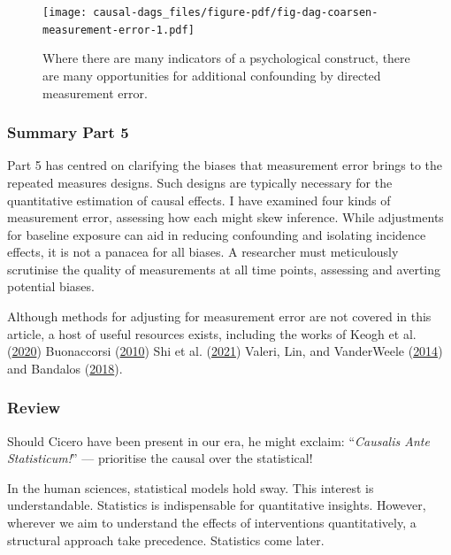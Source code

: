 \documentclass[
  singlecolumn]{article}
\begin{document}
\begin{figure}

{\centering \texttt{[image: causal-dags\_files/figure-pdf/fig-dag-coarsen-measurement-error-1.pdf]}

}

\caption{\label{fig-dag-coarsen-measurement-error}Where there are many
indicators of a psychological construct, there are many opportunities
for additional confounding by directed measurement error.}

\end{figure}

\hypertarget{summary-part-5}{%
\subsubsection{Summary Part 5}\label{summary-part-5}}

Part 5 has centred on clarifying the biases that measurement error
brings to the repeated measures designs. Such designs are typically
necessary for the quantitative estimation of causal effects. I have
examined four kinds of measurement error, assessing how each might skew
inference. While adjustments for baseline exposure can aid in reducing
confounding and isolating incidence effects, it is not a panacea for all
biases. A researcher must meticulously scrutinise the quality of
measurements at all time points, assessing and averting potential
biases.

Although methods for adjusting for measurement error are not covered in
this article, a host of useful resources exists, including the works of
Keogh et al. (\protect\hyperlink{ref-keogh2020}{2020}) Buonaccorsi
(\protect\hyperlink{ref-buonaccorsi2010}{2010}) Shi et al.
(\protect\hyperlink{ref-shi2021}{2021}) Valeri, Lin, and VanderWeele
(\protect\hyperlink{ref-valeri2014}{2014}) and Bandalos
(\protect\hyperlink{ref-bandalos2018}{2018}).

\hypertarget{review}{%
\subsubsection{Review}\label{review}}

Should Cicero have been present in our era, he might exclaim:
``\emph{Causalis Ante Statisticum!}'' --- prioritise the causal over the
statistical!

In the human sciences, statistical models hold sway. This interest is
understandable. Statistics is indispensable for quantitative insights.
However, wherever we aim to understand the effects of interventions
quantitatively, a structural approach take precedence. Statistics come
later.
\end{document}
